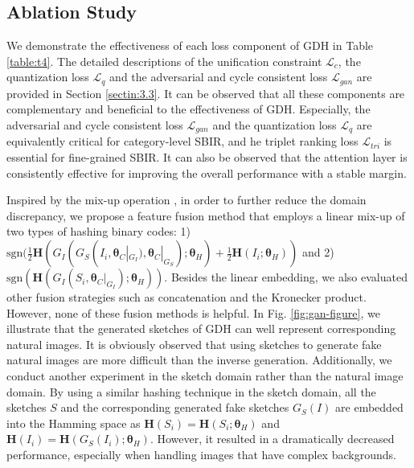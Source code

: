 \documentclass[runningheads]{llncs}
\newcommand{\sgn}{{\mathrm{sgn}}}
\begin{document}
\subsection{Ablation Study}
We demonstrate the effectiveness of each loss component of GDH in Table \ref{table:t4}. The detailed descriptions of the unification constraint $\mathcal{L}_{c}$, the quantization loss $\mathcal{L}_{q}$ and the adversarial and cycle consistent loss $\mathcal{L}_{gan}$ are provided in Section \ref{sectin:3.3}. It can be observed that all these components are complementary and beneficial to the effectiveness of GDH. Especially, the adversarial and cycle consistent loss $\mathcal{L}_{gan}$ and the quantization loss $\mathcal{L}_{q}$ are equivalently critical for category-level SBIR, and he triplet ranking loss $\mathcal{L}_{tri}$ is essential for fine-grained SBIR. It can also be observed that the attention layer is consistently effective for improving the overall performance with a stable margin.

Inspired by the mix-up operation \cite{abs-1710-09412}, in order to further reduce the domain discrepancy, we propose a feature fusion method that employs a linear mix-up of two types of hashing binary codes: 1) $\sgn(\frac{1}{2} \mathbf{H} ( G_I ( G_S(I_i, \bm{\theta}_C|_{G_I}), \bm{\theta}_C|_{G_S}  ); \bm{\theta}_H  ) + \frac{1}{2} \mathbf{H} ( I_i; \bm{\theta}_H  ))$ and 2) $\sgn(\mathbf{H} \left ( G_I\left ( S_i, \bm{\theta}_C|_{G_I} \right ); \bm{\theta}_H \right ))$. Besides the linear embedding, we also evaluated other fusion strategies such as concatenation and the Kronecker product. However, none of these fusion methods is helpful. In Fig. \ref{fig:gan-figure}, we illustrate that the generated sketches of GDH can well represent corresponding natural images. It is obviously observed that using sketches to generate fake natural images are more difficult than the inverse generation. Additionally, we conduct another experiment in the sketch domain rather than the natural image domain. By using a similar hashing technique in the sketch domain, all the sketches $S$ and the corresponding generated fake sketches $G_S(I)$ are embedded into the Hamming space as $\mathbf{H}(S_i) = \mathbf{H} \left ( S_i; \bm{\theta}_H \right )$ and  $\mathbf{H}(I_i) = \mathbf{H} \left ( G_S\left ( I_i \right ); \bm{\theta}_H \right )$.
However, it resulted in a dramatically decreased performance, especially when handling images that have complex backgrounds.
\end{document}
